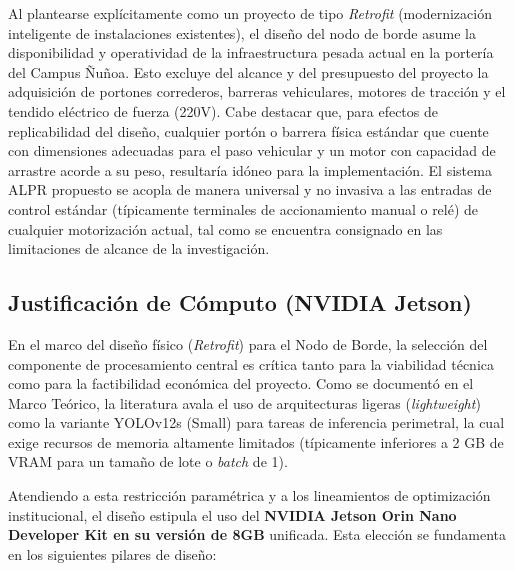 Al plantearse explícitamente como un proyecto de tipo \textit{Retrofit} (modernización inteligente de instalaciones existentes), el diseño del nodo de borde asume la disponibilidad y operatividad de la infraestructura pesada actual en la portería del Campus Ñuñoa. Esto excluye del alcance y del presupuesto del proyecto la adquisición de portones correderos, barreras vehiculares, motores de tracción y el tendido eléctrico de fuerza (220V). Cabe destacar que, para efectos de replicabilidad del diseño, cualquier portón o barrera física estándar que cuente con dimensiones adecuadas para el paso vehicular y un motor con capacidad de arrastre acorde a su peso, resultaría idóneo para la implementación. El sistema ALPR propuesto se acopla de manera universal y no invasiva a las entradas de control estándar (típicamente terminales de accionamiento manual o relé) de cualquier motorización actual, tal como se encuentra consignado en las limitaciones de alcance de la investigación.

\subsection{Justificación de Cómputo (NVIDIA Jetson)}

En el marco del diseño físico (\textit{Retrofit}) para el Nodo de Borde, la selección del componente de procesamiento central es crítica tanto para la viabilidad técnica como para la factibilidad económica del proyecto. Como se documentó en el Marco Teórico, la literatura avala el uso de arquitecturas ligeras (\textit{lightweight}) como la variante YOLOv12s (Small) para tareas de inferencia perimetral, la cual exige recursos de memoria altamente limitados (típicamente inferiores a 2 GB de VRAM para un tamaño de lote o \textit{batch} de 1).

Atendiendo a esta restricción paramétrica y a los lineamientos de optimización institucional, el diseño estipula el uso del \textbf{NVIDIA Jetson Orin Nano Developer Kit en su versión de 8GB} unificada. Esta elección se fundamenta en los siguientes pilares de diseño:


